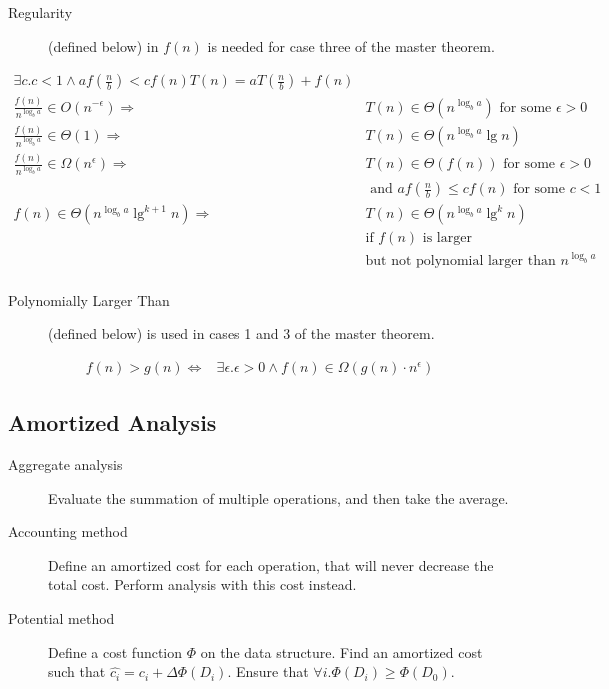 \documentclass[landscape]{cheat}
\begin{document}
\begin{multicols*}{3}
\begin{description}
    \item[Regularity] (defined below) in $f(n)$ is needed for case three of the master theorem.
\end{description}
\begin{align*}
    \exists c. c < 1 \land af\left(\frac n b\right) < cf(n)
    T(n) = a T\left(\frac n b\right) + f(n) \\
    \frac{f(n)}{n^{\log_b a}} \in O(n^{-\epsilon})  \Rightarrow& T(n) \in \Theta(n^{\log_b a}) \text { for some } \epsilon > 0  \\
    \frac{f(n)}{n^{\log_b a}} \in \Theta(1) \Rightarrow& T(n) \in \Theta(n^{\log_b a} \lg n) \\
    \frac{f(n)}{n^{\log_b a}} \in \Omega(n^{\epsilon}) \Rightarrow& T(n) \in \Theta(f(n)) \text{ for some } \epsilon > 0 \\&\text{ and } af(\frac{n}{b}) \leq cf(n) \text{ for some } c < 1 \\
f(n) \in \Theta(n^{\log_b a} \lg^{k +1} n) \Rightarrow& T(n) \in \Theta(n^{\log_b a} \lg^{k} n)\\ &\text{if } f(n) \text{ is larger}\\ &\text{but not polynomial larger than } n^{\log_b a}\\
\end{align*}
\begin{description}
    \item[Polynomially Larger Than] (defined below) is used in cases 1 and 3 of the master theorem.
\end{description}
\begin{align*}
    f(n) > g(n) \Leftrightarrow& \exists \epsilon. \epsilon > 0 \land f(n) \in \Omega(g(n) \cdot n^\epsilon)
\end{align*}

\subsection{Amortized Analysis}
\begin{description}
    \item[Aggregate analysis] Evaluate the summation of multiple operations, and then take the average.
    \item[Accounting method] Define an amortized cost for each operation, that will never decrease the total cost.
        Perform analysis with this cost instead.
    \item[Potential method] Define a cost function $\Phi$ on the data structure. Find an amortized cost such that $\hat{c_i} = c_i + \Delta \Phi(D_i)$.
        Ensure that $\forall i. \Phi(D_i) \geq \Phi(D_0)$.
\end{description}


\end{multicols*}
\end{document}
